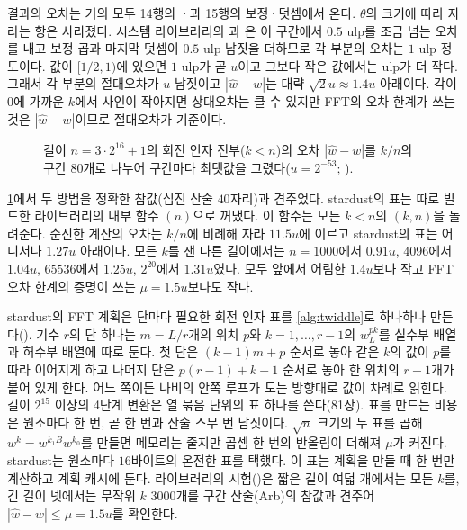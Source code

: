 결과의 오차는 거의 모두 14행의 ·과 15행의 보정·덧셈에서 온다. $\theta$의 크기에 따라 자라는 항은 사라졌다. 시스템 라이브러리의 과 은 이 구간에서 $0.5$ ulp를 조금 넘는 오차를 내고 보정 곱과 마지막 덧셈이 $0.5$ ulp 남짓을 더하므로 각 부분의 오차는 $1$ ulp 정도이다. 값이 $[1/2,1)$에 있으면 $1$ ulp가 곧 $u$이고 그보다 작은 값에서는 ulp가 더 작다. 그래서 각 부분의 절대오차가 $u$ 남짓이고 $|\widehat w-w|$는 대략 $\sqrt2u\approx1.4u$ 아래이다. 각이 $0$에 가까운 $k$에서 사인이 작아지면 상대오차는 클 수 있지만 FFT의 오차 한계가 쓰는 것은 $|\widehat w-w|$이므로 절대오차가 기준이다.

\begin{figure}[htbp]
\centering
{}
\caption{길이 $n=3\cdot2^{16}+1$의 회전 인자 전부($k<n$)의 오차 $|\widehat w-w|$를 $k/n$의 구간 $80$개로 나누어 구간마다 최댓값을 그렸다($u=2^{-53}$; ).}
\label{fig:twiddle}
\end{figure}

\cref{fig:twiddle}에서 두 방법을 정확한 참값(십진 산술 $40$자리)과 견주었다. stardust의 표는 따로 빌드한 라이브러리의 내부 함수 $(n)$으로 꺼냈다. 이 함수는 모든 $k<n$의 $(k,n)$을 돌려준다. 순진한 계산의 오차는 $k/n$에 비례해 자라 $11.5u$에 이르고 stardust의 표는 어디서나 $1.27u$ 아래이다. 모든 $k$를 잰 다른 길이에서는 $n=1000$에서 $0.91u$, $4096$에서 $1.04u$, $65536$에서 $1.25u$, $2^{20}$에서 $1.31u$였다. 모두 앞에서 어림한 $1.4u$보다 작고 FFT 오차 한계의 증명이 쓰는 $\mu=1.5u$보다도 작다.

stardust의 FFT 계획은 단마다 필요한 회전 인자 표를 \cref{alg:twiddle}로 하나하나 만든다(). 기수 $r$의 단 하나는 $m=L/r$개의 위치 $p$와 $k=1,\dots,r-1$의 $w_L^{pk}$를 실수부 배열과 허수부 배열에 따로 둔다. 첫 단은 $(k-1)m+p$ 순서로 놓아 같은 $k$의 값이 $p$를 따라 이어지게 하고 나머지 단은 $p(r-1)+k-1$ 순서로 놓아 한 위치의 $r-1$개가 붙어 있게 한다. 어느 쪽이든 나비의 안쪽 루프가 도는 방향대로 값이 차례로 읽힌다. 길이 $2^{15}$ 이상의 4단계 변환은 열 묶음 단위의 표 하나를 쓴다(81장). 표를 만드는 비용은 원소마다  한 번, 곧  한 번과 산술 스무 번 남짓이다. $\sqrt n$ 크기의 두 표를 곱해 $w^{k}=w^{k_1B}w^{k_0}$를 만들면 메모리는 줄지만 곱셈 한 번의 반올림이 더해져 $\mu$가 커진다. stardust는 원소마다 $16$바이트의 온전한 표를 택했다. 이 표는 계획을 만들 때 한 번만 계산하고 계획 캐시에 둔다. 라이브러리의 시험()은 짧은 길이 여덟 개에서는 모든 $k$를, 긴 길이 넷에서는 무작위 $k$ $3000$개를 구간 산술(Arb)의 참값과 견주어 $|\widehat w-w|\le\mu=1.5u$를 확인한다.

